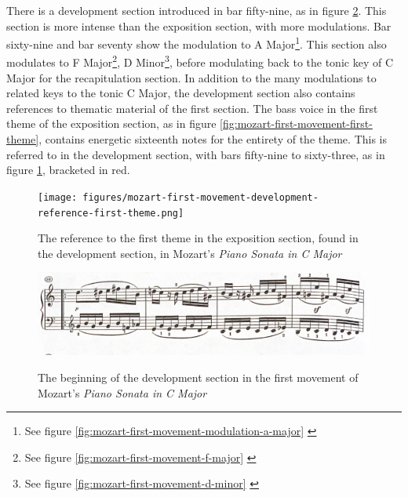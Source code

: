 There is a development section introduced in bar fifty-nine, as in figure \ref{fig:mozart-first-movement-development-start}\autocite{Henle_1977}. This section is more intense than the exposition section, with more modulations. Bar sixty-nine and bar seventy show the modulation to A Major\footnote{See figure \ref{fig:mozart-first-movement-modulation-a-major} \citeauthor{Henle_1977}}. This section also modulates to F Major\footnote{See figure \ref{fig:mozart-first-movement-f-major} \citeauthor{Henle_1977}}, D Minor\footnote{See figure \ref{fig:mozart-first-movement-d-minor} \citeauthor{Henle_1977}}, before modulating back to the tonic key of C Major for the recapitulation section. In addition to the many modulations to related keys to the tonic C Major, the development section also contains references to thematic material of the first section. The bass voice in the first theme of the exposition section, as in figure \ref{fig:mozart-first-movement-first-theme}\autocite{Henle_1977}, contains energetic sixteenth notes for the entirety of the theme. This is referred to in the development section, with bars fifty-nine to sixty-three, as in figure \ref{fig:mozart-first-movement-development-reference-first-theme}\autocite{Henle_1977}, bracketed in red. 

\begin{figure}
    \centering
    \texttt{[image: figures/mozart-first-movement-development-reference-first-theme.png]}
    \caption{The reference to the first theme in the exposition section, found in the development section, in Mozart's \textit{Piano Sonata in C Major}}
    \label{fig:mozart-first-movement-development-reference-first-theme}
\end{figure}

\begin{figure}
    \centering
    \includegraphics[width=\textwidth]{figures/mozart-first-movement-development-start.png}
    \caption{The beginning of the development section in the first movement of Mozart's \textit{Piano Sonata in C Major}}\autocite{Henle_1977}
    \label{fig:mozart-first-movement-development-start}
\end{figure}

